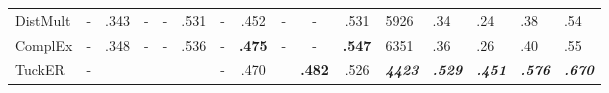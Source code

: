 \documentclass{article}
\begin{document}
\begin{table}[t!]
\begin{tabular}{l@{\hskip 5pt}c@{\hskip 3pt}c@{\hskip 3pt}c@{\hskip 3pt}c@{\hskip 3pt}c@{\hskip 6pt}c@{\hskip 3pt}c@{\hskip 3pt}c@{\hskip 3pt}c@{\hskip 3pt}c@{\hskip 3pt}HHHHH}
		 \midrule 
		 DistMult \cite{ruffinelli2020you,DistMult-ICLR15} & - & .343 & - & - & .531 & - & .452 & - & - & .531 & 5926 & .34 & .24 & .38 & .54\\
		 ComplEx \cite{ruffinelli2020you,DistMult-ICLR15} & - & .348 & - & - & .536 & - & \textbf{.475} & - & - & \textbf{.547} & 6351 & .36 & .26 & .40 & .55\\
		 TuckER \cite{TuckER} & - &  &  &  &  & - & .470 &  & \textbf{.482} & .526 & \textbf{\textit{4423}} & \textbf{\textit{.529}} & \textbf{\textit{.451}} &  \textbf{\textit{.576}} & \textbf{\textit{.670}}\\
		\bottomrule
		\bottomrule
	\end{tabular}
\end{table}
\end{document}

